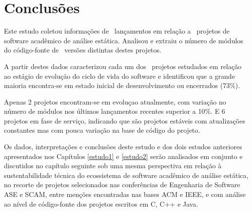 
\section{Conclusões} \label{estudo3:conclusoes} %

Este estudo coletou informações de \ReleasesCount \ lançamentos em relação a
\ProjectsWithReleasesCount \ projetos de software acadêmico de análise
estática. Analisou e extraiu o número de módulos do código-fonte de
\ReleasesMetricsCount \ versões distintas destes projetos.

A partir destes dados caracterizou cada um dos \SoftwareCount \ projetos
estudados em relação ao estágio de evolução do ciclo de vida do software e
identificou que a grande maioria encontra-se em estado inicial de
desenvolvimento ou encerrados (73\%).

Apenas 2 projetos encontram-se em evoluçao atualmente, com variação no número
de módulos nos últimos lançamentos recentes superior a 10\%. E 6 projetos em
fase de serviço, indicando que são projetos estáveis com atualizações
constantes mas com pouca variação na base de código do projeto.

Os dados, interpretações e conclusões deste estudo e dos dois estudos
anteriores apresentados nos Capítulos \ref{estudo1} e \ref{estudo2} serão
analisados em conjunto e discutidos no capítulo seguinte sob uma mesma
perspectiva em relação à sustentabilidade técnica do ecossistema de software
acadêmico de análise estática, no recorte de projetos selecionados nas
conferências de Engenharia de Software ASE e SCAM, entre menções encontradas
nas bases ACM e IEEE, e com análise ao nível de código-fonte dos projetos
escritos em C, C++ e Java.

